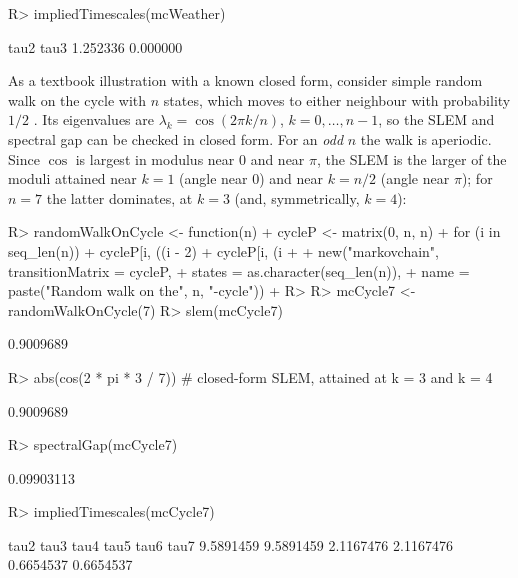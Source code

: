 \documentclass[
  nojss]{jss}
\begin{document}
\begin{CodeChunk}
\begin{CodeInput}
R> impliedTimescales(mcWeather)
\end{CodeInput}
\begin{CodeOutput}
    tau2     tau3 
1.252336 0.000000 
\end{CodeOutput}
\end{CodeChunk}

As a textbook illustration with a known closed form, consider simple random
walk on the cycle with \(n\) states, which moves to either neighbour with
probability \(1/2\) \citep[Example 12.9]{levinPeres2017}. Its eigenvalues are
\(\lambda_k = \cos(2\pi k/n)\), \(k=0,\ldots,n-1\), so the SLEM and spectral gap
can be checked in closed form. For an \emph{odd} \(n\) the walk is aperiodic. Since
\(\cos\) is largest in modulus near \(0\) and near \(\pi\), the SLEM is the larger
of the moduli attained near \(k=1\) (angle near \(0\)) and near \(k=n/2\) (angle
near \(\pi\)); for \(n=7\) the latter dominates, at \(k=3\) (and, symmetrically,
\(k=4\)):

\begin{CodeChunk}
\begin{CodeInput}
R> randomWalkOnCycle <- function(n) {
+   cycleP <- matrix(0, n, n)
+   for (i in seq_len(n)) {
+     cycleP[i, ((i - 2) %
+     cycleP[i, (i %
+   }
+   new("markovchain", transitionMatrix = cycleP,
+       states = as.character(seq_len(n)),
+       name = paste("Random walk on the", n, "-cycle"))
+ }
R> 
R> mcCycle7 <- randomWalkOnCycle(7)
R> slem(mcCycle7)
\end{CodeInput}
\begin{CodeOutput}
[1] 0.9009689
\end{CodeOutput}
\begin{CodeInput}
R> abs(cos(2 * pi * 3 / 7)) # closed-form SLEM, attained at k = 3 and k = 4
\end{CodeInput}
\begin{CodeOutput}
[1] 0.9009689
\end{CodeOutput}
\begin{CodeInput}
R> spectralGap(mcCycle7)
\end{CodeInput}
\begin{CodeOutput}
[1] 0.09903113
\end{CodeOutput}
\begin{CodeInput}
R> impliedTimescales(mcCycle7)
\end{CodeInput}
\begin{CodeOutput}
     tau2      tau3      tau4      tau5      tau6      tau7 
9.5891459 9.5891459 2.1167476 2.1167476 0.6654537 0.6654537 
\end{CodeOutput}
\end{CodeChunk}
\end{document}
